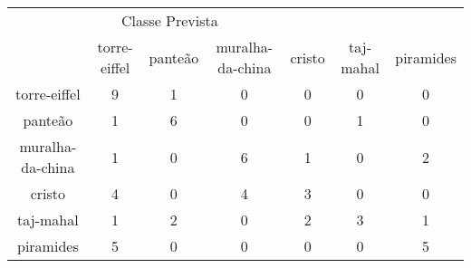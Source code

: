 \begin{tabular}{|c|c|c|c|c|c|c|}
\hline
\multicolumn{5}{|c|}{Classe Prevista}\\
 & torre-eiffel & panteão & muralha-da-china & cristo & taj-mahal & piramides\\
torre-eiffel & 9 & 1 & 0 & 0 & 0 & 0\\
panteão & 1 & 6 & 0 & 0 & 1 & 0\\
muralha-da-china & 1 & 0 & 6 & 1 & 0 & 2\\
cristo & 4 & 0 & 4 & 3 & 0 & 0\\
taj-mahal & 1 & 2 & 0 & 2 & 3 & 1\\
piramides & 5 & 0 & 0 & 0 & 0 & 5\\
\end{tabular}
